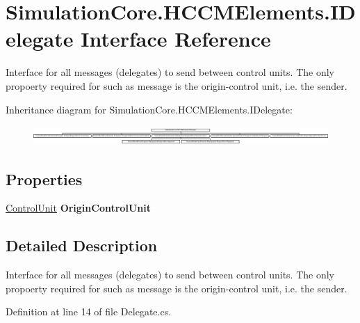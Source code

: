 \hypertarget{interface_simulation_core_1_1_h_c_c_m_elements_1_1_i_delegate}{}\section{Simulation\+Core.\+H\+C\+C\+M\+Elements.\+I\+Delegate Interface Reference}
\label{interface_simulation_core_1_1_h_c_c_m_elements_1_1_i_delegate}


Interface for all messages (delegates) to send between control units. The only propoerty required for such as message is the origin-\/control unit, i.\+e. the sender.  


Inheritance diagram for Simulation\+Core.\+H\+C\+C\+M\+Elements.\+I\+Delegate\+:\begin{figure}[H]
\begin{center}
\leavevmode
\includegraphics[height=0.725702cm]{interface_simulation_core_1_1_h_c_c_m_elements_1_1_i_delegate}
\end{center}
\end{figure}
\subsection*{Properties}
\begin{DoxyCompactItemize}
\item 
\hyperlink{class_simulation_core_1_1_h_c_c_m_elements_1_1_control_unit}{Control\+Unit} {\bfseries Origin\+Control\+Unit}\hypertarget{interface_simulation_core_1_1_h_c_c_m_elements_1_1_i_delegate_a10c4dd8e0c741afba7d4d92d9d401d16}{}\label{interface_simulation_core_1_1_h_c_c_m_elements_1_1_i_delegate_a10c4dd8e0c741afba7d4d92d9d401d16}

\end{DoxyCompactItemize}


\subsection{Detailed Description}
Interface for all messages (delegates) to send between control units. The only propoerty required for such as message is the origin-\/control unit, i.\+e. the sender. 



Definition at line 14 of file Delegate.\+cs.

